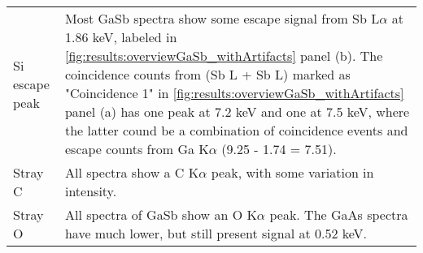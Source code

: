 \begin{table}[phtb]
\begin{center}
\begin{tabular}{p{3.5cm}p{11.1cm}}
			Si escape peak                             & Most GaSb spectra show some escape signal from Sb L$\alpha$ at 1.86 keV, labeled in \cref{fig:results:overviewGaSb_withArtifacts} panel (b). The coincidence counts from (Sb L + Sb L) marked as "Coincidence 1" in \cref{fig:results:overviewGaSb_withArtifacts} panel (a) has one peak at 7.2 keV and one at 7.5 keV, where the latter cound be a combination of coincidence events and escape counts from Ga K$\alpha$ (9.25 - 1.74 = 7.51).                                                                                                                                                          \\
			Stray C                                    & All spectra show a C K$\alpha$ peak, with some variation in intensity.                                                                                                                                                                               \\
			Stray O                                    & All spectra of GaSb show an O K$\alpha$ peak. The GaAs spectra have much lower, but still present signal at 0.52 keV.                                                                                          \\
			\hline
		\end{tabular}
	\end{center}
\end{table}
